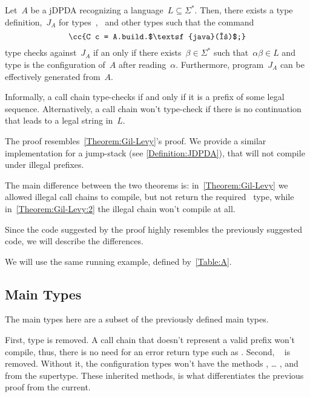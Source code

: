 \begin{theorem}\label{Theorem:Gil-Levy:2}
  Let~$A$ be a jDPDA recognizing a language~$L⊆Σ^*$.
  Then, there exists a \Java type definition,~$J_A$ for types~,~ and
    other types such that the \Java command
  \begin{equation}
    \label{Equation:prefix:result}
    \cc{C c = A.build.$\textsf{java}(α)$;}
  \end{equation}
  type checks against~$J_A$ if an only if there exists~$β∈Σ^*$ such
  that~$αβ∈L$ and type  is the configuration of~$A$ after reading~$α$.
  Furthermore, program~$J_A$ can be effectively generated from~$A$.
\end{theorem}

Informally, a call chain type-checks if and only if it is a prefix
  of some legal sequence.
Alternatively, a call chain won't type-check if there is no
  continuation that leads to a legal string in~$L$.

The proof resembles~\cref{Theorem:Gil-Levy}'s proof.
We provide a similar implementation for a jump-stack (see \cref{Definition:JDPDA}),
  that will not compile under illegal prefixes.

The main difference between the two theorems is:
  in~\cref{Theorem:Gil-Levy} we allowed illegal call chains to compile,
  but not return the required~ type, while in~\cref{Theorem:Gil-Levy:2}
  the illegal chain won't compile at all.

Since the code suggested by the proof highly resembles the previously
  suggested code, we will describe the differences.

We will use the same running example, defined by~\cref{Table:A}.

\subsection{Main Types}
The main types here are a subset of the previously defined main types.

\begin{quote}
\end{quote}

First, type  is removed.
A call chain that doesn't represent a valid prefix won't compile,
  thus, there is no need for an error return type such as .
Second, ~ is removed.
Without it, the configuration types won't have the
  methods , … , and \cc{\$()} from the supertype.
These inherited methods, is what differentiates the previous proof from the current.

